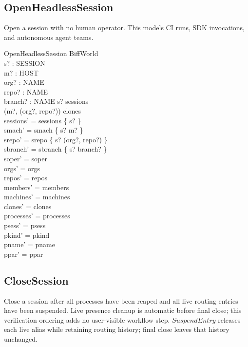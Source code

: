 \documentclass[a4paper,10pt,fleqn]{article}
\begin{document}
\subsection{OpenHeadlessSession}

Open a session with no human operator.  This models CI runs, SDK
invocations, and autonomous agent teams.

\begin{schema}{OpenHeadlessSession}
  \Delta BiffWorld \\
  s? : SESSION \\
  m? : HOST \\
  org? : NAME \\
  repo? : NAME \\
  branch? : NAME
  \where
  s? \notin sessions \\
  (m?, (org?, repo?)) \in clones \\
  sessions' = sessions \cup \{ s? \} \\
  smach' = smach \cup \{ s? \mapsto m? \} \\
  srepo' = srepo \cup \{ s? \mapsto (org?, repo?) \} \\
  sbranch' = sbranch \cup \{ s? \mapsto branch? \} \\
  soper' = soper \\
  orgs' = orgs \\
  repos' = repos \\
  members' = members \\
  machines' = machines \\
  clones' = clones \\
  processes' = processes \\
  psess' = psess \\
  pkind' = pkind \\
  pname' = pname \\
  ppar' = ppar
\end{schema}

\subsection{CloseSession}

Close a session after all processes have been reaped and all live routing
entries have been suspended.  Live presence cleanup is automatic before
final close; this verification ordering adds no user-visible workflow
step.  $SuspendEntry$ releases each live alias while retaining routing
history; final close leaves that history unchanged.
\end{document}
